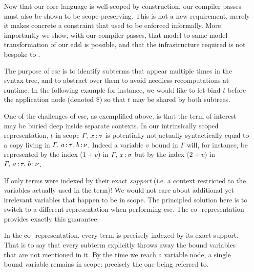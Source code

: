 
Now that our core language is well-scoped by construction, our compiler passes must also be shown to be scope-preserving.
%
This is not a new requirement, merely it makes concrete a constraint that used to be enforced informally.
%
More importantly we show, with our compiler passes, that model-to-same-model transformation of our \ac{edsl} is possible, and that the infrastructure required is not bespoke to \Velo{}.

The purpose of \ac{cse} is to identify subterms that appear multiple times in the syntax tree, and to abstract over them to avoid needless recomputations at runtime.
%
In the following example for instance, we would like to let-bind $t$ before the application node (denoted \$) so that $t$ may be shared by both subtrees.

\begin{center}
  \cseexamplegraph{}
\end{center}

One of the challenges of \ac{cse}, as exemplified above, is that the term of interest may be buried deep inside separate contexts.
%
In our intrinsically scoped representation, $t$ in scope
$\Gamma,\, x\,\mathord{:}\,\sigma$ is potentially not actually
syntactically equal to a copy living in $\Gamma,\, a\,\mathord{:}\,\tau,\, b\,\mathord{:}\,\nu$.
%
Indeed a variable $v$ bound in $\Gamma$ will, for instance, be
represented by the \DeBruijn{} index ($1+v$) in $\Gamma,\, x\,\mathord{:}\,\sigma$
but by the index ($2+v$) in $\Gamma,\, a\,\mathord{:}\,\tau,\, b\,\mathord{:}\,\nu$.

If only terms were indexed by their exact \emph{support}
(i.e. a context restricted to the variables actually used in the term)!
%
We would not care about additional yet irrelevant variables that happen to be in scope.
%
The principled solution here is to switch to a different representation when performing \ac{cse}.
%
The co-\DeBruijn{} representation~\cite{DBLP:journals/corr/abs-1807-04085} provides exactly this guarantee.


In the co-\DeBruijn{} representation, every term is precisely indexed by its exact support.
%
That is to say that every subterm explicitly throws away the bound variables that are not mentioned in it.
%
By the time we reach a variable node, a single bound variable remains in scope:
%
precisely the one being referred to.

